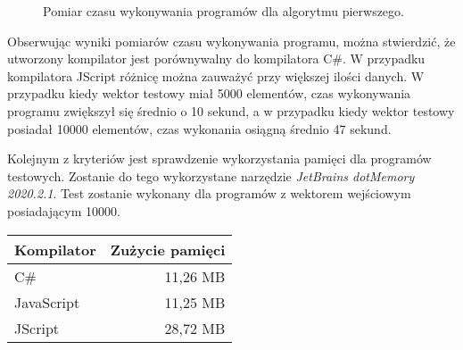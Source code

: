 \begin{figure}[h!]
  \centering
  \caption{Pomiar czasu wykonywania programów dla algorytmu pierwszego.}
\end{figure}

\par Obserwując wyniki pomiarów czasu wykonywania programu, można stwierdzić, że utworzony kompilator jest porównywalny do kompilatora C\#. W przypadku kompilatora JScript różnicę można zauważyć przy większej ilości danych. W przypadku kiedy wektor testowy miał 5000 elementów, czas wykonywania programu zwiększył się średnio o 10 sekund, a w przypadku kiedy wektor testowy posiadał 10000 elementów, czas wykonania osiągną średnio 47 sekund.

\par Kolejnym z kryteriów jest sprawdzenie wykorzystania pamięci dla programów testowych. Zostanie do tego wykorzystane narzędzie \textit{JetBrains dotMemory 2020.2.1}. Test zostanie wykonany dla programów z wektorem wejściowym posiadającym 10000.

\begin{table}[h!]
  \centering
  \begin{tabular}{|l|r|}
  \hline
  Kompilator & Zużycie pamięci \\ \hline
  C\# & 11,26 MB \\ \hline
  JavaScript & 11,25 MB \\ \hline
  JScript & 28,72 MB \\ \hline
  \end{tabular}
\end{table}


